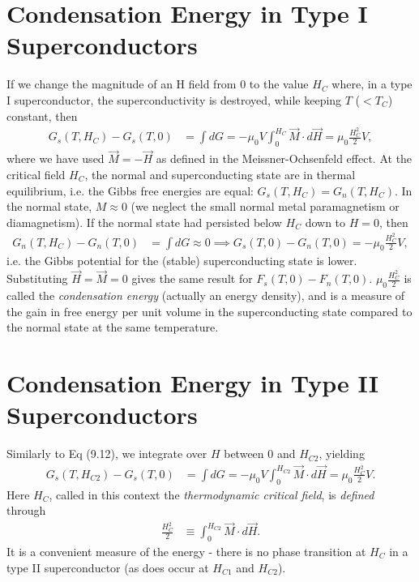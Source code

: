 \documentclass[a4paper, 11pt, normalem]{report}
\begin{document}
\section{Condensation Energy in Type I Superconductors}
If we change the magnitude of an H field from 0 to the value $H_C$ where, in a type I superconductor, the superconductivity is destroyed, while keeping $T$ ($<T_C$) constant, then
\begin{align}
    G_s(T,H_C) - G_s(T,0) &= \int dG = -\mu_0 V\int_0^{H_C} \vec{M}\cdot d\vec{H} = \mu_0\frac{H_C^2}{2}V,
\end{align}
where we have used $\vec{M}=-\vec{H}$ as defined in the Meissner-Ochsenfeld effect.
At the critical field $H_C$, the normal and superconducting state are in thermal equilibrium, i.e. the Gibbs free energies are equal: $G_s(T,H_C) = G_n(T,H_C)$.
In the normal state, $M\approx0$ (we neglect the small normal metal paramagnetism or diamagnetism).
If the normal state had persisted below $H_C$ down to $H=0$, then
\begin{align}
    G_n(T,H_C) - G_n(T,0) &= \int dG \approx 0 \implies G_s(T,0) - G_n(T,0) = -\mu_0\frac{H_C^2}{2}V,
\end{align}
i.e. the Gibbs potential for the (stable) superconducting state is lower.
Substituting $\vec{H}=\vec{M}=0$ gives the same result for $F_s(T,0)-F_n(T,0)$.
$\mu_0\frac{H_C^2}{2}$ is called the \emph{condensation energy} (actually an energy density), and is a measure of the gain in free energy per unit volume in the superconducting state compared to the normal state at the same temperature.

\section{Condensation Energy in Type II Superconductors}
Similarly to Eq (9.12), we integrate over $H$ between 0 and $H_{C2}$, yielding
\begin{align}
    G_s(T,H_{C2}) - G_s(T,0) &= \int dG = -\mu_0V\int_0^{H_{C2}}\vec{M}\cdot d\vec{H} = \mu_0\frac{H_C^2}{2}V.
\end{align}
Here $H_C$, called in this context the \emph{thermodynamic critical field}, is \emph{defined} through
\begin{align}
    \frac{H_C^2}{2} &\equiv \int_0^{H_{C2}}\vec{M}\cdot d\vec{H}.
\end{align}
It is a convenient measure of the energy - there is no phase transition at $H_C$ in a type II superconductor (as does occur at $H_{C1}$ and $H_{C2}$).
\end{document}
